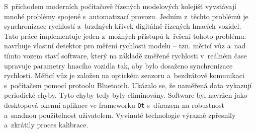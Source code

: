 S~příchodem moderních počítačově řízených modelových kolejišť vyvstávají mnohé
problémy spojené s~automatizací provozu. Jedním z~těchto problémů je
synchronizace rychlostí a~brzdných křivek digitálně řízených hnacích vozidel.
Tato práce implementuje jeden z~možných přístupů k~řešení tohoto problému:
navrhuje vlastní detektor pro měření rychlosti modelu -- tzn. měricí vůz a~nad
tímto vozem staví software, který na základě změřené rychlosti v~reálném čase
upravuje parametry hnacího vozidla tak, aby bylo dosaženo synchronizace
rychlosti. Měřicí vůz je založen na optickém senzoru a~bezdrátové komunikaci
s~počítačem pomocí protoolu Bluetooth. Ukázalo se, že naměřená data vykazují
periodické chyby. Tyto chyby tedy byly eliminovány. Software byl navržen jako
desktopová okenní aplikace ve frameworku \texttt{Qt} s~důrazem na robustnost
a~snadnou použitelnost uživatelem. Vyvinuté technologie výrazně zpřesnily
a~zkrátily proces kalibrace.
